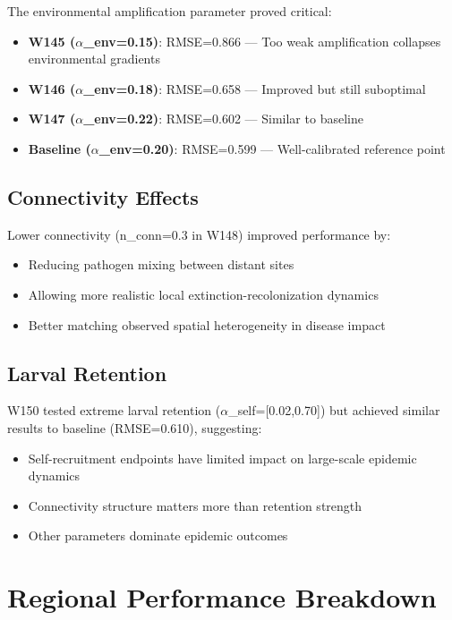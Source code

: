 \documentclass[11pt]{article}
\begin{document}
The environmental amplification parameter proved critical:

\begin{itemize}
\item \textbf{W145 ($\alpha$\_env=0.15)}: RMSE=0.866 --- Too weak amplification collapses environmental gradients
\item \textbf{W146 ($\alpha$\_env=0.18)}: RMSE=0.658 --- Improved but still suboptimal
\item \textbf{W147 ($\alpha$\_env=0.22)}: RMSE=0.602 --- Similar to baseline
\item \textbf{Baseline ($\alpha$\_env=0.20)}: RMSE=0.599 --- Well-calibrated reference point
\end{itemize}

\subsection{Connectivity Effects}

Lower connectivity (n\_conn=0.3 in W148) improved performance by:
\begin{itemize}
\item Reducing pathogen mixing between distant sites
\item Allowing more realistic local extinction-recolonization dynamics  
\item Better matching observed spatial heterogeneity in disease impact
\end{itemize}

\subsection{Larval Retention}

W150 tested extreme larval retention ($\alpha$\_self=[0.02,0.70]) but achieved similar results to baseline (RMSE=0.610), suggesting:
\begin{itemize}
\item Self-recruitment endpoints have limited impact on large-scale epidemic dynamics
\item Connectivity structure matters more than retention strength
\item Other parameters dominate epidemic outcomes
\end{itemize}

\section{Regional Performance Breakdown}
\end{document}
